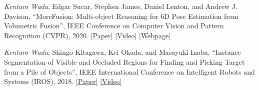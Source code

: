 \documentclass[letterpaper,MMMyyyy,nonstop]{simpleresumecv}
\begin{document}
\begin{body}
\textit{Kentaro Wada}, Edgar Sucar, Stephen James, Daniel Lenton, and Andrew J.
Davison,
``MoreFusion: Multi-object Reasoning for 6D Pose Estimation from Volumetric
Fusion'',
IEEE Conference on Computer Vision and Pattern Recognition (CVPR), 2020.
\href{https://arxiv.org/abs/2004.04336}{\underline{[Paper]}}
\href{https://youtu.be/6oLUhuZL4ko}{\underline{[Video]}}
\href{https://morefusion.wkentaro.com}{\underline{[Webpage]}}



\BigGapNoBreak

\textit{Kentaro Wada}, Shingo Kitagawa, Kei Okada, and Masayuki Inaba,
``Instance Segmentation of Visible and Occluded Regions for Finding and Picking Target from a Pile of Objects'',
IEEE International Conference on Intelligent Robots and Systems (IROS), 2018.
\href{https://arxiv.org/abs/2001.07475}{\underline{[Paper]}}
\href{https://youtu.be/tNLtXb04i3w}{\underline{[Video]}}


\end{body}
\end{document}
